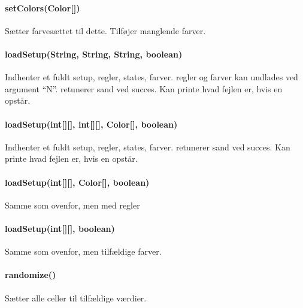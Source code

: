 \paragraph{setColors(Color[])} Sætter farvesættet til dette. Tilføjer manglende farver.

\paragraph{loadSetup(String, String, String, boolean)} Indhenter et fuldt setup, regler, states, farver. regler og farver kan undlades ved argument ``N''.
retunerer sand ved succes. Kan printe hvad fejlen er, hvis en opstår.

\paragraph{loadSetup(int[][], int[][], Color[], boolean)} Indhenter et fuldt setup, regler, states, farver.
retunerer sand ved succes. Kan printe hvad fejlen er, hvis en opstår.

\paragraph{loadSetup(int[][], Color[], boolean)} Samme som ovenfor, men med \gol regler

\paragraph{loadSetup(int[][], boolean)} Samme som ovenfor, men tilfældige farver.

\paragraph{randomize()} Sætter alle celler til tilfældige værdier.

